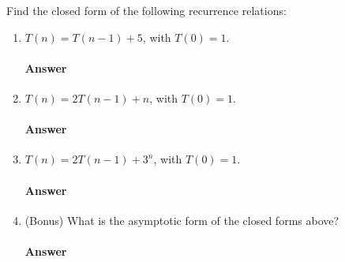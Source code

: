 \collab{\todo{}}

Find the closed form of the following recurrence relations:

\begin{enumerate}
    \item $T(n) = T(n-1) + 5$, with $T(0)=1$.
        \paragraph{Answer}
        \todo{}

    \item $T(n) = 2 T(n-1) + n$, with $T(0)=1$.
        \paragraph{Answer}
        \todo{}

    \item $T(n) = 2 T(n-1) + 3^n$, with $T(0)=1$.
        \paragraph{Answer}
        \todo{}

    \item (Bonus) What is the asymptotic form of the closed forms above?
        \paragraph{Answer}
        \todo{}
\end{enumerate}
